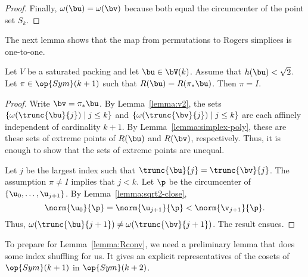 \begin{proof}
Finally, $\omega(\bu) = \omega(\bv)$ because both equal the
circumcenter of the point set $S_k$.
%
\end{proof}

The next lemma shows that the map from permutations to Rogers
simplices is one-to-one.

\begin{lemma} 
  Let $V$ be a saturated packing and let $\bu\in \bV(k)$.  Assume that
  $h(\bu)<\sqrt2$.  Let $\pi\in\op{Sym}(k+1)$ such that $R(\bu)=
  R(\pi_*\bu)$.  Then $\pi= I$.
\end{lemma}

\begin{proof} 
  Write $\bv = \pi_*\bu$.  By Lemma~\ref{lemma:v2}, the sets
  $\{\omega(\trunc{\bu}{j})\mid j\le k\}$ and
  $\{\omega(\trunc{\bv}{j})\mid j\le k\}$ are each affinely
  independent of cardinality $k+1$.  By
  Lemma~\ref{lemma:simplex-poly}, these are these sets of extreme
  points of $R(\bu)$ and $R(\bv)$, respectively.  Thus, it is enough
  to show that the sets of extreme points are unequal.

  Let $j$ be the largest index such that
  $\trunc{\bu}{j}=\trunc{\bv}{j}$.  The assumption $\pi\ne I$ implies
  that $j<k$.  Let $\p$ be the circumcenter of
  $\{\u_0,\ldots,\u_{j+1}\}$.  By Lemma~\ref{lemma:sqrt2-close},
\[  
\norm{\u_0}{\p} = \norm{\u_{j+1}}{\p} < \norm{\v_{j+1}}{\p}.
\] 
Thus, $\omega(\trunc{\bu}{j+1}) \ne \omega(\trunc{\bv}{j+1})$.  The result ensues.
\end{proof}

To prepare for Lemma~\ref{lemma:Rconv}, we need a preliminary lemma
that does some index shuffling for us.  It gives an explicit
representatives of the cosets of $\op{Sym}(k+1)$ in $\op{Sym}(k+2)$.


